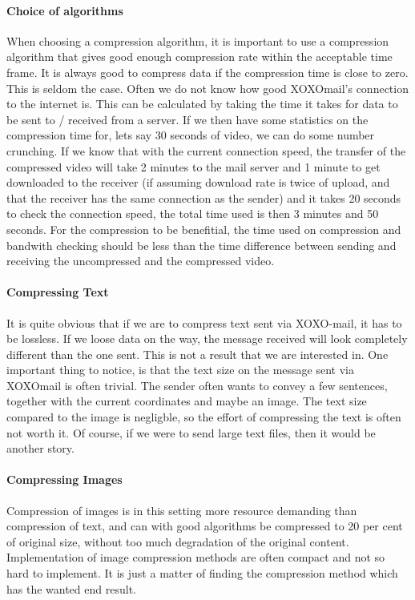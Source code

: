 \paragraph{Choice of algorithms}
When choosing a compression algorithm, it is important to use a compression algorithm that gives good enough compression rate within the acceptable time frame. It is always good to compress data if the compression time is close to zero. This is seldom the case.
\newline
\newline
Often we do not know how good XOXOmail's connection to the internet is. This can be calculated by taking the time it takes for data to be sent to / received from a server. If we then have some statistics on the compression time for, lets say 30 seconds of video, we can do some number crunching. If we know that with the current connection speed, the transfer of the compressed video will take 2 minutes to the mail server and 1 minute to get downloaded to the receiver (if assuming download rate is twice of upload, and that the receiver has the same connection as the sender) and it takes 20 seconds to check the connection speed, the total time used is then 3 minutes and 50 seconds. For the compression to be benefitial, the time used on compression and bandwith checking should be less than the time difference between sending and receiving the uncompressed and the compressed video.

\paragraph{Compressing Text}
It is quite obvious that if we are to compress text sent via XOXO-mail, it has to be lossless. If we loose data on the way, the message received will look completely different than the one sent. This is not a result that we are interested in. One important thing to notice, is that the text size on the message sent via XOXOmail is often trivial. The sender often wants to convey a few sentences, together with the current coordinates and maybe an image. The text size compared to the image is negligble, so the effort of compressing the text is often not worth it. Of course, if we were to send large text files, then it would be another story.

\paragraph{Compressing Images}
Compression of images is in this setting more resource demanding than compression of text, and can with good algorithms be compressed to 20 per cent of original size, without too much degradation of the original content. Implementation of image compression methods are often compact and not so hard to implement. It is just a matter of finding the compression method which has the wanted end result.

